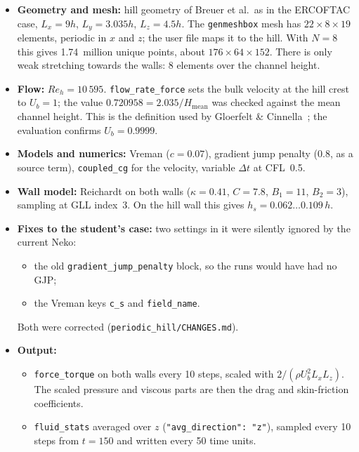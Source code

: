 \documentclass[11pt,a4paper]{article}
\newcommand{\code}[1]{\texttt{#1}}
\begin{document}
\begin{itemize}
  \item \textbf{Geometry and mesh:} hill geometry of Breuer et al.\ as in the
    ERCOFTAC case, $L_x = 9h$, $L_y = 3.035h$, $L_z = 4.5h$. The
    \code{genmeshbox} mesh has $22\times8\times19$ elements, periodic in $x$
    and $z$; the user file maps it to the hill. With $N = 8$ this gives
    1.74~million unique points, about $176\times64\times152$. There is only
    weak stretching towards the walls: 8 elements over the channel height.
  \item \textbf{Flow:} $Re_h = 10\,595$. \code{flow\_rate\_force} sets the
    bulk velocity at the hill crest to $U_b = 1$; the value
    $0.720958 = 2.035/H_\mathrm{mean}$ was checked against the mean channel
    height. This is the definition used by Gloerfelt \&
    Cinnella~\cite{gloerfelt2019}; the evaluation confirms
    $U_b = 0.9999$.
  \item \textbf{Models and numerics:} Vreman ($c = 0.07$), gradient jump
    penalty (0.8, as a source term), \code{coupled\_cg} for the velocity,
    variable $\Delta t$ at CFL~0.5.
  \item \textbf{Wall model:} Reichardt on both walls ($\kappa = 0.41$,
    $C = 7.8$, $B_1 = 11$, $B_2 = 3$), sampling at GLL index~3. On the hill
    wall this gives $h_s = 0.062\ldots0.109\,h$.
  \item \textbf{Fixes to the student's case:} two settings in it were
    silently ignored by the current Neko:
    \begin{itemize}
      \item the old \code{gradient\_jump\_penalty} block, so the runs would
        have had no GJP;
      \item the Vreman keys \code{c\_s} and \code{field\_name}.
    \end{itemize}
    Both were corrected (\code{periodic\_hill/CHANGES.md}).
  \item \textbf{Output:}
    \begin{itemize}
      \item \code{force\_torque} on both walls every 10 steps, scaled with
        $2/(\rho U_b^2 L_x L_z)$. The scaled pressure and viscous parts are
        then the drag and skin-friction coefficients.
      \item \code{fluid\_stats} averaged over $z$
        (\code{"avg\_direction": "z"}), sampled every 10 steps from $t = 150$
        and written every 50 time units.
    \end{itemize}
\end{itemize}
\end{document}
